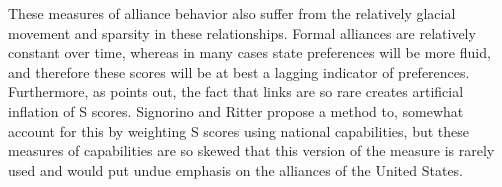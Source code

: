 These measures of alliance behavior also suffer from the relatively glacial movement and sparsity in these relationships. Formal alliances are relatively constant over time, whereas in many cases state preferences will be more fluid, and therefore these scores will be at best a lagging indicator of preferences. Furthermore, as \citet{hage:2011} points out, the fact that links are so rare creates artificial inflation of S scores. Signorino and Ritter propose a method to, somewhat account for this by weighting S scores using national capabilities, but these measures of capabilities are so skewed that this version of the measure is rarely used and would put undue emphasis on the alliances of the United States.